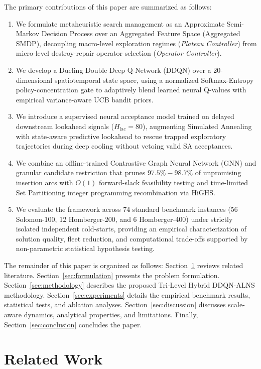 \documentclass{ieeeaccess}
\begin{document}
The primary contributions of this paper are summarized as follows:
\begin{enumerate}\setlength{\itemsep}{0pt}\setlength{\parskip}{0pt}
    \item We formulate metaheuristic search management as an Approximate Semi-Markov Decision Process over an Aggregated Feature Space (Aggregated SMDP), decoupling macro-level exploration regimes (\emph{Plateau Controller}) from micro-level destroy-repair operator selection (\emph{Operator Controller}).
    \item We develop a Dueling Double Deep Q-Network (DDQN) over a 20-dimensional spatiotemporal state space, using a normalized Softmax-Entropy policy-concentration gate to adaptively blend learned neural Q-values with empirical variance-aware UCB bandit priors.
    \item We introduce a supervised neural acceptance model trained on delayed downstream lookahead signals ($H_{\text{lac}}=80$), augmenting Simulated Annealing with state-aware predictive lookahead to rescue trapped exploratory trajectories during deep cooling without vetoing valid SA acceptances.
    \item We combine an offline-trained Contrastive Graph Neural Network (GNN) and granular candidate restriction that prunes $97.5\%-98.7\%$ of unpromising insertion arcs with $O(1)$ forward-slack feasibility testing and time-limited Set Partitioning integer programming recombination via HiGHS.
    \item We evaluate the framework across 74 standard benchmark instances (56 Solomon-100, 12 Homberger-200, and 6 Homberger-400) under strictly isolated independent cold-starts, providing an empirical characterization of solution quality, fleet reduction, and computational trade-offs supported by non-parametric statistical hypothesis testing.
\end{enumerate}

The remainder of this paper is organized as follows: Section~\ref{sec:related_work} reviews related literature. Section~\ref{sec:formulation} presents the problem formulation. Section~\ref{sec:methodology} describes the proposed Tri-Level Hybrid DDQN-ALNS methodology. Section~\ref{sec:experiments} details the empirical benchmark results, statistical tests, and ablation analyses. Section~\ref{sec:discussion} discusses scale-aware dynamics, analytical properties, and limitations. Finally, Section~\ref{sec:conclusion} concludes the paper.

\section{Related Work}
\label{sec:related_work}
\end{document}

